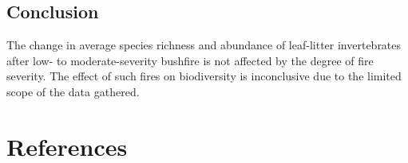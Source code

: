 \subsection{Conclusion}

The change in average species richness and abundance of leaf-litter invertebrates after low- to moderate-severity bushfire is not affected by the degree of fire severity. The effect of such fires on biodiversity is inconclusive due to the limited scope of the data gathered.

\break

\section{References}

\printbibliography[heading=none]
